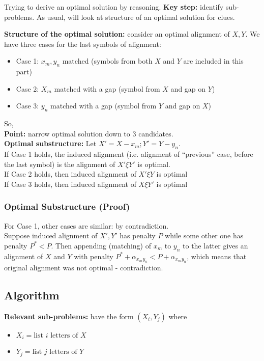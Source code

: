 \documentclass{scrartcl}
\begin{document}
Trying to derive an optimal solution by reasoning. {\bf Key step: } identify sub-problems. As usual, will look at structure of an optimal solution for clues.

{\bf Structure of the optimal solution: } consider an optimal alignment of $X,
Y$. We have three cases for the last symbols of alignment:
\begin{itemize}
\item Case 1: $x_m, y_n$ matched (symbols from both $X$ and $Y$ are included in
  this part)
\item Case 2: $X_m$ matched with a gap (symbol from $X$ and gap on $Y$)
\item Case 3: $y_n$ matched with a gap (symbol from $Y$ and gap on $X$)
\end{itemize}
So,\\
{\bf Point: } narrow optimal solution down to 3 candidates.\\
{\bf Optimal substructure: } Let $X' = X - x_m; Y' = Y - y_n$.\\
If Case 1 holds, the induced alignment (i.e. alignment of ``previous'' case,
before the last symbol) is the alignment of $X' \xi Y'$ is optimal.\\
If Case 2 holds, then induced alignment of $X' \xi Y$ is optimal\\
If Case 3 holds, then induced alignment of $X \xi Y'$ is optimal\\

\subsubsection{Optimal Substructure (Proof)}
\label{sec:11-1-2}
For Case 1, other cases are similar: by contradiction.\\
Suppose induced alignment of $X', Y'$ has penalty $P$ while some other one has
penalty $P^* < P$. Then appending (matching) of $x_m$ to $y_n$ to the latter
gives an alignment of $X$ and $Y$ with penalty $P^* + \alpha_{x_m y_n} < P +
\alpha_{x_m y_n}$, which means that original alignment was not optimal -
contradiction.

\subsection{Algorithm}
\label{sec:11-1-2} {\bf Relevant sub-problems: } have the form $(X_i, Y_j)$
where
\begin{itemize}
\item $X_i = \text{list } i \text{ letters of } X$
\item $Y_j = \text{list } j \text{ letters of } Y$
\end{itemize}
\end{document}
